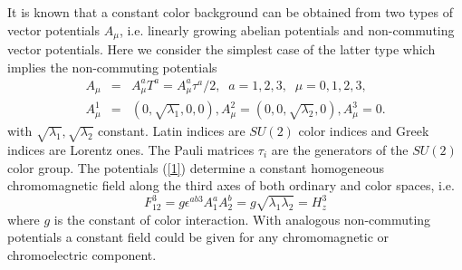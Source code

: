 \documentclass[a4paper,12pt,a4]{article}
\begin{document}
It is known \cite{9,10} that a constant color background
can be obtained from two types of vector potentials
$A_{\mu}$, i.e. linearly growing abelian potentials and non-commuting
vector potentials.  Here we consider the
simplest case of the latter type which implies
the non-commuting potentials
\begin{eqnarray}
A_{\mu}&=&A^a_{\mu}T^a=A^a_{\mu}\tau^a/2, 
\;\;a=1,2,3, \;\; \mu = 0,1,2,3,\nonumber\\
 A^1_{\mu}&=&(0,\sqrt{\lambda_1},0,0), A^2_{\mu}=(0,0,\sqrt{\lambda_2},0),
A^3_{\mu}=0.
\label{1}
\end{eqnarray}
with $\sqrt{\lambda_1},\sqrt{\lambda_2}$ constant.
Latin indices are $SU(2)$ color indices and Greek indices
are Lorentz ones. The Pauli matrices $\tau_i$ are the generators of the
$SU(2)$ color group. The potentials (\ref{1})
determine a constant homogeneous chromomagnetic field
along the third axes of both ordinary and color spaces, 
i.e.
\begin{equation}
F^3_{12} = g\epsilon^{ab3}A^a_1A^b_2 = g\sqrt{\lambda_1
\lambda_2} = H^3_z
\label{2}
\end{equation}
where $g$ is the constant of color interaction.  
With analogous non-commuting
potentials a constant field could be
given for any chromomagnetic or chromoelectric
component.  
\end{document}
